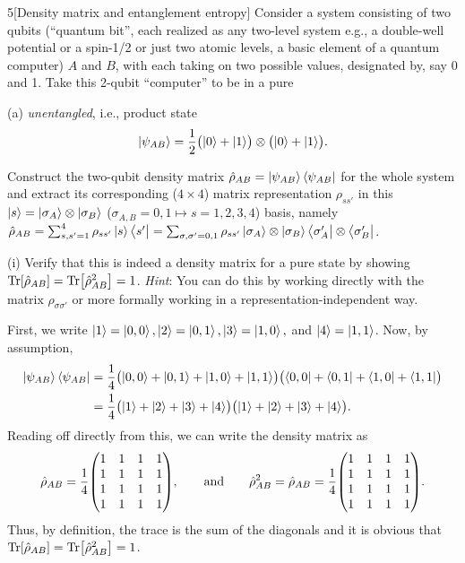 \documentclass[12pt]{article}
\begin{document}
\begin{problem}{5}[Density matrix and entanglement entropy]
Consider a system consisting of two qubits (``quantum bit'', each realized as
any two-level system e.g., a double-well potential or a spin-1/2 or just two
atomic levels, a basic element of a quantum computer) $A$ and $B$, with each
taking on two possible values, designated by, say 0 and 1. Take this 2-qubit
``computer'' to be in a pure

(a) \textit{unentangled}, i.e., product state
\begin{equation}
    \ket{\psi_{AB}}=\frac12\qty(\ket{0}+\ket1)\otimes\qty(\ket0+\ket1).
\end{equation}

Construct the two-qubit density matrix
$\hat\rho_{AB}=\ket{\psi_{AB}}\bra{\psi_{AB}}$ for the whole system and extract
its corresponding ($4\times4$) matrix representation $\rho_{ss'}$ in this
$\ket{s}=\ket{\sigma_A}\otimes\ket{\sigma_B}$ ($\sigma_{A,B}=0,1\mapsto
s=1,2,3,4$) basis, namely
$\hat\rho_{AB}=\sum_{s,s'=1}^4\rho_{ss'}\ket{s}\bra{s'}=\sum_{\sigma,\sigma'=0,1}\rho_{ss'}\ket{\sigma_A}\otimes\ket{\sigma_{B}}\bra{\sigma_A'}\otimes\bra{\sigma_B'}$.

\qquad(i) Verify that this is indeed a density matrix for a pure state by
showing $\Tr[\hat\rho_{AB}]=\Tr[\hat\rho_{AB}^2]=1$. \textit{Hint}: You can do 
this by working directly with the matrix $\rho_{\sigma\sigma'}$ or more 
formally working in a representation-independent way.
\begin{solution}
First, we write $\ket{1}=\ket{0,0},\ket{2}=\ket{0,1},\ket{3}=\ket{1,0},$ and
$\ket{4}=\ket{1,1}$. Now, by assumption,
\begin{align}\label{p5a:psi}
    \ket{\psi_{AB}}\bra{\psi_{AB}}
    &=\frac14\qty(\ket{0,0}+\ket{0,1}+\ket{1,0}+\ket{1,1})
    \qty(\bra{0,0}+\bra{0,1}+\bra{1,0}+\bra{1,1})\notag\\
    &=\frac14\qty(\ket{1}+\ket{2}+\ket{3}+\ket{4})\qty(\ket{1}+\ket{2}+\ket{3}+\ket{4}).
\end{align}
Reading off directly from this, we can write the density matrix as
\begin{equation}
    \hat{\rho}_{AB}=\frac14\mqty(1&1&1&1\\1&1&1&1\\1&1&1&1\\1&1&1&1),
    \qquad\t{and}\qquad
    \hat{\rho}_{AB}^2=\hat{\rho}_{AB}
    =\frac14\mqty(1&1&1&1\\1&1&1&1\\1&1&1&1\\1&1&1&1).
\end{equation}
Thus, by definition, the trace is the sum of the diagonals and it is obvious
that $\Tr[\hat\rho_{AB}]=\Tr[\hat\rho_{AB}^2]=1$.
\end{solution}


\end{problem}
\end{document}
